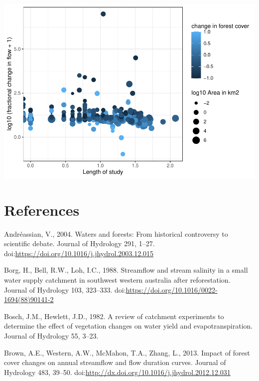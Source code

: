 \documentclass[]{elsarticle} %
\begin{document}
\includegraphics{Forest_and_Water_files/figure-latex/unnamed-chunk-12-1.pdf}

\hypertarget{references}{%
\section*{References}\label{references}}

\hypertarget{refs}{}
\leavevmode\hypertarget{ref-andreassian2004}{}%
Andréassian, V., 2004. Waters and forests: From historical controversy
to scientific debate. Journal of Hydrology 291, 1--27.
doi:\href{https://doi.org/https://doi.org/10.1016/j.jhydrol.2003.12.015}{https://doi.org/10.1016/j.jhydrol.2003.12.015}

\leavevmode\hypertarget{ref-borg1988}{}%
Borg, H., Bell, R.W., Loh, I.C., 1988. Streamflow and stream salinity in
a small water supply catchment in southwest western australia after
reforestation. Journal of Hydrology 103, 323--333.
doi:\href{https://doi.org/https://doi.org/10.1016/0022-1694(88)90141-2}{https://doi.org/10.1016/0022-1694(88)90141-2}

\leavevmode\hypertarget{ref-hewlett1984}{}%
Bosch, J.M., Hewlett, J.D., 1982. A review of catchment experiments to
determine the effect of vegetation changes on water yield and
evapotranspiration. Journal of Hydrology 55, 3--23.

\leavevmode\hypertarget{ref-brown2013}{}%
Brown, A.E., Western, A.W., McMahon, T.A., Zhang, L., 2013. Impact of
forest cover changes on annual streamflow and flow duration curves.
Journal of Hydrology 483, 39--50.
doi:\href{https://doi.org/http://dx.doi.org/10.1016/j.jhydrol.2012.12.031}{http://dx.doi.org/10.1016/j.jhydrol.2012.12.031}
\end{document}
